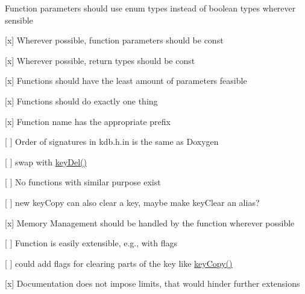 {\ttfamily }

{\ttfamily 
\begin{DoxyItemize}
\item Function parameters should use enum types instead of boolean types wherever sensible
\item \mbox{[}x\mbox{]} Wherever possible, function parameters should be {\ttfamily const}
\item \mbox{[}x\mbox{]} Wherever possible, return types should be {\ttfamily const}
\item \mbox{[}x\mbox{]} Functions should have the least amount of parameters feasible
\end{DoxyItemize}}

{\ttfamily }

{\ttfamily 
\begin{DoxyItemize}
\item \mbox{[}x\mbox{]} Functions should do exactly one thing
\item \mbox{[}x\mbox{]} Function name has the appropriate prefix
\item \mbox{[} \mbox{]} Order of signatures in kdb.\+h.\+in is the same as Doxygen
\begin{DoxyItemize}
\item \mbox{[} \mbox{]} swap with {\ttfamily \hyperlink{group__key_ga3df95bbc2494e3e6703ece5639be5bb1}{key\+Del()}}
\end{DoxyItemize}
\item \mbox{[} \mbox{]} No functions with similar purpose exist
\begin{DoxyItemize}
\item \mbox{[} \mbox{]} new key\+Copy can also clear a key, maybe make {\ttfamily key\+Clear} an alias?
\end{DoxyItemize}
\end{DoxyItemize}}

{\ttfamily }

{\ttfamily 
\begin{DoxyItemize}
\item \mbox{[}x\mbox{]} Memory Management should be handled by the function wherever possible
\end{DoxyItemize}}

{\ttfamily }

{\ttfamily 
\begin{DoxyItemize}
\item \mbox{[} \mbox{]} Function is easily extensible, e.\+g., with flags
\begin{DoxyItemize}
\item \mbox{[} \mbox{]} could add flags for clearing parts of the key like {\ttfamily \hyperlink{group__key_ga505575ebef060066984fe0f590081e37}{key\+Copy()}}
\end{DoxyItemize}
\item \mbox{[}x\mbox{]} Documentation does not impose limits, that would hinder further extensions
\end{DoxyItemize}}

